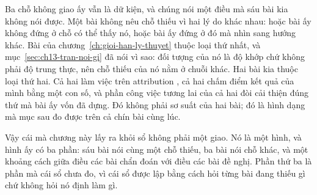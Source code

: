 %
Ba chỗ không giao ấy vẫn là dữ kiện, và chúng nói một điều mà sáu bài kia không
nói được. Một bài không nêu chỗ thiếu vì hai lý do khác nhau: hoặc bài ấy không
đứng ở chỗ có thể thấy nó, hoặc bài ấy đứng ở đó mà nhìn sang hướng khác. Bài
của chương~\ref{ch:gioi-han-ly-thuyet} thuộc loại thứ nhất, và
mục~\ref{sec:ch13-tran-noi-gi} đã nói vì sao: đối tượng của nó là
độ khớp chứ không phải độ trung thực, nên chỗ thiếu của nó nằm ở
chuỗi khác. Hai bài kia thuộc loại thứ hai. Cả hai làm việc trên attribution
, cả hai chấm điểm kết quả của mình bằng một con số, và
phần công việc
tương lai của cả hai đòi cải thiện đúng thứ mà bài ấy vốn đã dựng. Đó không phải
sơ suất của hai bài; đó là hình dạng mà mục sau đo được trên cả chín bài cùng
lúc.

%
Vậy cái mà chương này lấy ra khỏi sổ không phải một giao. Nó là một hình, và hình
ấy có ba phần: sáu bài nói cùng một chỗ thiếu, ba bài nói chỗ khác, và một khoảng
cách giữa điều các bài chẩn đoán với điều các bài đề nghị. Phần thứ ba là phần mà
cái sổ chưa đo, vì cái sổ được lập bằng cách hỏi từng bài đang thiếu gì chứ không
hỏi nó định làm gì.
